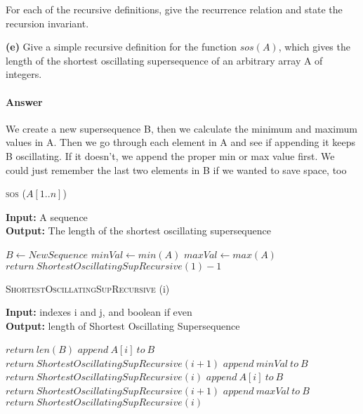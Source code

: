 \documentclass{article}
\begin{document}


For each of the recursive definitions, give the recurrence
relation and state the recursion invariant.

{\bf (e)} Give a simple recursive definition for the function $sos(A)$, which gives
the length of the shortest oscillating supersequence of an arbitrary array
A of integers.

\paragraph{Answer}

We create a new supersequence B, then we calculate the minimum and maximum values in A.
Then we go through each element in A and see if appending it keeps B oscillating. If it
doesn't, we append the proper min or max value first. We could just remember the last two
elements in B if we wanted to save space, too

\begin{algorithm} \caption{\textsc{sos} ($A[1..n]$)}\label{alg:seb}
    {\bf Input:} A sequence\\
    {\bf Output:} The length of the shortest oscillating supersequence
    \begin{algorithmic}[1]
        \State$B \gets NewSequence$
        \State$minVal \gets min(A)$
        \State$maxVal \gets max(A)$
        \State$return\ ShortestOscillatingSupRecursive(1) -1$
    \end{algorithmic}
\end{algorithm}

\begin{algorithm} \caption{\textsc{ShortestOscillatingSupRecursive} (i)}\label{alg:seb}
    {\bf Input:} indexes i and j, and boolean if even\\
    {\bf Output:} length of Shortest Oscillating Supersequence
    \begin{algorithmic}[1]
            \State$return\ len(B)$
        \Else{}
                    \State$append\ A[i]\ to\ B$
                    \State$return\ ShortestOscillatingSupRecursive(i+1)$
                \Else{}
                    \State$append\ minVal\ to\ B$
                    \State$return\ ShortestOscillatingSupRecursive(i)$
                \EndIf{}
            \Else{}
                    \State$append\ A[i]\ to\ B$
                    \State$return\ ShortestOscillatingSupRecursive(i+1)$
                \Else{}
                    \State$append\ maxVal\ to\ B$
                    \State$return\ ShortestOscillatingSupRecursive(i)$
                \EndIf{}
            \EndIf{}
        \EndIf{}
    \end{algorithmic}
\end{algorithm}
\todo{}
\end{document}

